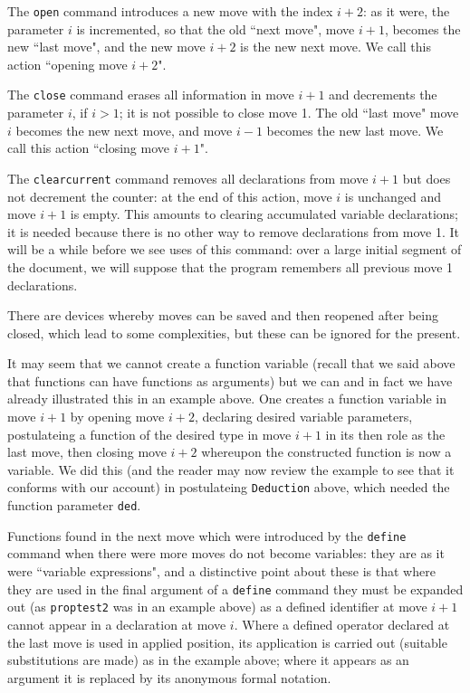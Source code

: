 \documentclass[12pt]{article}
\begin{document}
The {\tt open} command introduces a new move with the index $i+2$:  as it were, the parameter $i$ is incremented, so that the old ``next move", move $i+1$,
becomes the new ``last move", and the new move $i+2$ is the new next move.  We call this action ``opening move $i+2$".

The {\tt close} command erases all information in move $i+1$ and decrements the parameter $i$, if $i>1$;  it is not possible to close move 1.
The old ``last move" move $i$ becomes the new next move, and move $i-1$ becomes the new last move.  We call this action ``closing move $i+1$".

The {\tt clearcurrent} command removes all declarations from move $i+1$ but does not decrement the counter:  at the end of this action,
move $i$ is unchanged and move $i+1$ is empty.  This amounts to clearing accumulated variable declarations;  it is needed because there is no other way
to remove declarations from move 1.  It will be a while before we see uses of this command:  over a large initial segment of the document, we will suppose that the program remembers all previous move 1 declarations.

There are devices whereby moves can be saved and then reopened after being closed, which lead to some complexities, but these can be ignored for the present.

It may seem that we cannot create a function variable (recall that we said above that functions can have functions as arguments) but we can and in fact we have already illustrated this in an example above.  One creates a function variable in move $i+1$ by opening move $i+2$, declaring desired variable parameters, postulateing a function of the desired type in move $i+1$ in its then role as the last move, then closing move $i+2$ whereupon the constructed function is now a variable.   We did this (and the reader may now review the example to see that it conforms with our account) in postulateing {\tt Deduction} above, which needed the function parameter {\tt ded}.

Functions found in the next move which were  introduced by the {\tt define} command when there were more moves do not become variables:  they are as it were ``variable expressions", and a distinctive point about these is that where they are used in the final argument of a {\tt define} command they must be expanded out (as {\tt proptest2} was in an example above)
as a defined identifier at move $i+1$ cannot appear in a declaration at move $i$.  Where a defined operator declared at the last move is used in applied position, its application is carried out (suitable substitutions are made) as in the example above;  where it appears as an argument it is replaced by its anonymous formal notation.
\end{document}
